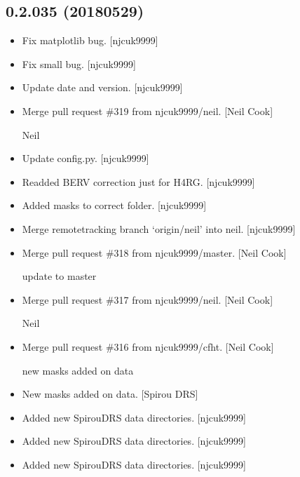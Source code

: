 \documentclass[a4paper,10pt,english]{report}
\begin{document}
\subsection{0.2.035 (2018\sphinxhyphen{}05\sphinxhyphen{}29)}
\label{\detokenize{misc/changelog:id447}}\begin{itemize}
\item {} 
Fix matplotlib bug. {[}njcuk9999{]}

\item {} 
Fix small bug. {[}njcuk9999{]}

\item {} 
Update date and version. {[}njcuk9999{]}

\item {} 
Merge pull request \#319 from njcuk9999/neil. {[}Neil Cook{]}

Neil

\item {} 
Update config.py. {[}njcuk9999{]}

\item {} 
Re\sphinxhyphen{}added BERV correction just for H4RG. {[}njcuk9999{]}

\item {} 
Added masks to correct folder. {[}njcuk9999{]}

\item {} 
Merge remote\sphinxhyphen{}tracking branch ‘origin/neil’ into neil. {[}njcuk9999{]}

\item {} 
Merge pull request \#318 from njcuk9999/master. {[}Neil Cook{]}

update to master

\item {} 
Merge pull request \#317 from njcuk9999/neil. {[}Neil Cook{]}

Neil

\item {} 
Merge pull request \#316 from njcuk9999/cfht. {[}Neil Cook{]}

new masks added on data

\item {} 
New masks added on data. {[}Spirou DRS{]}

\item {} 
Added new SpirouDRS data directories. {[}njcuk9999{]}

\item {} 
Added new SpirouDRS data directories. {[}njcuk9999{]}

\item {} 
Added new SpirouDRS data directories. {[}njcuk9999{]}


\end{itemize}
\end{document}
